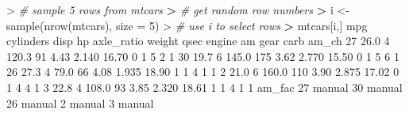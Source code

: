 \documentclass[
]{book}
\newenvironment{Shaded}{\begin{snugshade}}{\end{snugshade}}
\newcommand{\AttributeTok}[1]{\textcolor[rgb]{0.77,0.63,0.00}{#1}}
\newcommand{\CommentTok}[1]{\textcolor[rgb]{0.56,0.35,0.01}{\textit{#1}}}
\newcommand{\DecValTok}[1]{\textcolor[rgb]{0.00,0.00,0.81}{#1}}
\newcommand{\ErrorTok}[1]{\textcolor[rgb]{0.64,0.00,0.00}{\textbf{#1}}}
\newcommand{\FloatTok}[1]{\textcolor[rgb]{0.00,0.00,0.81}{#1}}
\newcommand{\FunctionTok}[1]{\textcolor[rgb]{0.00,0.00,0.00}{#1}}
\newcommand{\NormalTok}[1]{#1}
\newcommand{\OtherTok}[1]{\textcolor[rgb]{0.56,0.35,0.01}{#1}}
\newcommand{\SpecialCharTok}[1]{\textcolor[rgb]{0.00,0.00,0.00}{#1}}
\begin{document}
\begin{Shaded}
\begin{Highlighting}[]
\SpecialCharTok{\textgreater{}} \CommentTok{\# sample 5 rows from mtcars}
\ErrorTok{\textgreater{}} \CommentTok{\# get random row numbers}
\ErrorTok{\textgreater{}}\NormalTok{ i }\OtherTok{\textless{}{-}} \FunctionTok{sample}\NormalTok{(}\FunctionTok{nrow}\NormalTok{(mtcars), }\AttributeTok{size =} \DecValTok{5}\NormalTok{)}
\SpecialCharTok{\textgreater{}} \CommentTok{\# use i to select rows}
\ErrorTok{\textgreater{}}\NormalTok{ mtcars[i,]}
\NormalTok{    mpg cylinders  disp  hp axle\_ratio weight  qsec engine am gear carb am\_ch}
\DecValTok{27} \FloatTok{26.0}         \DecValTok{4} \FloatTok{120.3}  \DecValTok{91}       \FloatTok{4.43}  \FloatTok{2.140} \FloatTok{16.70}      \DecValTok{0}  \DecValTok{1}    \DecValTok{5}    \DecValTok{2}     \DecValTok{1}
\DecValTok{30} \FloatTok{19.7}         \DecValTok{6} \FloatTok{145.0} \DecValTok{175}       \FloatTok{3.62}  \FloatTok{2.770} \FloatTok{15.50}      \DecValTok{0}  \DecValTok{1}    \DecValTok{5}    \DecValTok{6}     \DecValTok{1}
\DecValTok{26} \FloatTok{27.3}         \DecValTok{4}  \FloatTok{79.0}  \DecValTok{66}       \FloatTok{4.08}  \FloatTok{1.935} \FloatTok{18.90}      \DecValTok{1}  \DecValTok{1}    \DecValTok{4}    \DecValTok{1}     \DecValTok{1}
\DecValTok{2}  \FloatTok{21.0}         \DecValTok{6} \FloatTok{160.0} \DecValTok{110}       \FloatTok{3.90}  \FloatTok{2.875} \FloatTok{17.02}      \DecValTok{0}  \DecValTok{1}    \DecValTok{4}    \DecValTok{4}     \DecValTok{1}
\DecValTok{3}  \FloatTok{22.8}         \DecValTok{4} \FloatTok{108.0}  \DecValTok{93}       \FloatTok{3.85}  \FloatTok{2.320} \FloatTok{18.61}      \DecValTok{1}  \DecValTok{1}    \DecValTok{4}    \DecValTok{1}     \DecValTok{1}
\NormalTok{   am\_fac}
\DecValTok{27}\NormalTok{ manual}
\DecValTok{30}\NormalTok{ manual}
\DecValTok{26}\NormalTok{ manual}
\DecValTok{2}\NormalTok{  manual}
\DecValTok{3}\NormalTok{  manual}
\end{Highlighting}
\end{Shaded}
\end{document}
